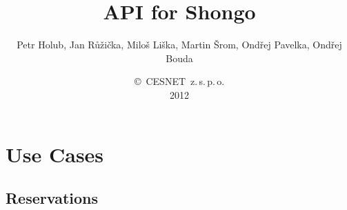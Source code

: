 \documentclass[a4paper]{report}
\begin{document}
\title{API for Shongo}
\author{Petr Holub, Jan Růžička, Miloš Liška, Martin Šrom, Ondřej Pavelka, Ondřej Bouda}
\date{\copyright~CESNET~z.\,s.\,p.\,o.\\2012}

\maketitle

\tableofcontents

\chapter{Use Cases}

\section{Reservations}
\end{document}
